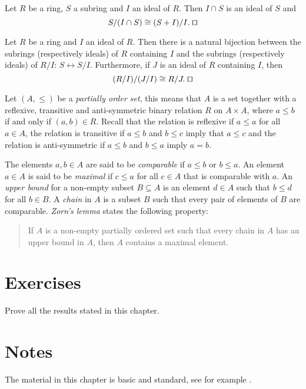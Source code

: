 \begin{theorem}
	Let $R$ be a ring,  $S$ a subring and $I$ an ideal of $R$. Then $I\cap S$ is an ideal of $S$ and
	$$S/(I\cap S)\cong (S+I)/I. \; \qed$$  
\end{theorem}

\begin{theorem} Let $R$ be a ring and $I$ an ideal of $R$. Then there is a natural bijection between the subrings (respectively ideals) of $R$ containing $I$ and the subrings (respectively ideals) of $R/I$: $S\leftrightarrow S/I$. Furthermore, if $J$ is an ideal of $R$ containing $I$, then
	$$(R/I)/(J/I)\cong R/J.\; \qed$$ 
\end{theorem}

Let $(A,\leq)$ be a {\em partially order set}, this means that $A$ is a set together with a 
reflexive, transitive and anti-symmetric binary relation
$R$ on $A\times A$, where $a\leq b$ if and only if $(a,b)\in R$. 
Recall that the relation is reflexive if $a\leq a$ for all $a\in A$, the relation is transitive if 
$a\leq b$ and $b\leq c$ imply that 
$a\leq c$ and the relation is anti-symmetric if $a\leq b$ and $b\leq a$ imply $a=b$.

The elements $a,b\in A$ are said to be {\em comparable} if $a\leq b$ or $b\leq
a$. An element $a\in A$ is said to be {\em maximal} if 
$c\leq a$ 
for all $c\in A$
that is comparable with $a$. 
An {\em upper bound} for a non-empty subset $B\subseteq A$ is an element $d\in
A$ such that $b\leq d$ for all $b\in B$. A {\em chain} in $A$ is a subset 
$B$ such that every pair of elements of $B$ are comparable. 
{\em Zorn's lemma} states the following property: 
\begin{quote}
	If $A$ is a non-empty partially ordered set such that every chain in 
	$A$ has an upper bound in $A$, then $A$ contains a maximal element. 
\end{quote}


\section*{Exercises}

\begin{prob} Prove all the results stated in this chapter.
\end{prob}



\section*{Notes}
The material in this chapter is basic and standard, see for example \cite{Cohn}.
